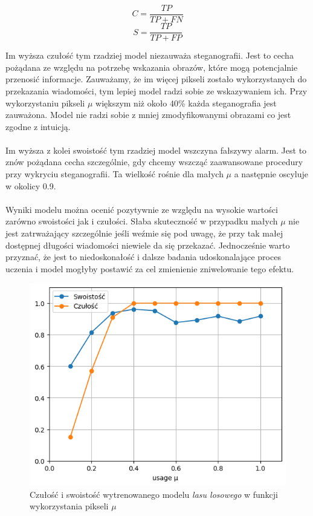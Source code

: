     \begin{equation}
        C = \frac{TP}{TP+FN}
        \label{eq:cul}
    \end{equation}
    \begin{equation}
    S = \frac{TP}{TP+FP}
        \label{eq:swo}
    \end{equation}

    Im wyższa czułość tym rzadziej model niezauważa steganografii. Jest to cecha pożądana ze względu na potrzebę wskazania obrazów, które mogą potencjalnie przenosić informacje. Zauważamy, że im więcej pikseli zostało wykorzystanych do przekazania wiadomości, tym lepiej model radzi sobie ze wskazywaniem ich. Przy wykorzystaniu pikseli $\mu$ większym niż około 40\% każda steganografia jest zauważona. Model nie radzi sobie z mniej zmodyfikowanymi obrazami co jest zgodne z intuicją. \\
    \\
    Im wyższa z kolei swoistość tym rzadziej model wszczyna fałszywy alarm. Jest to znów pożądana cecha szczególnie, gdy chcemy wszcząć zaawansowane procedury przy wykryciu steganografii. Ta wielkość rośnie dla małych $\mu$ a następnie oscyluje w okolicy 0.9. \\
    \\
    Wyniki modelu można ocenić pozytywnie ze względu na wysokie wartości zarówno swoistości jak i czułości. Słaba skuteczność w przypadku małych $\mu$ nie jest zatrważający szczególnie jeśli weźmie się pod uwagę, że przy tak małej dostępnej długości wiadomości niewiele da się przekazać. Jednocześnie warto przyznać, że jest to niedoskonałość i dalsze badania udoskonalające proces uczenia i model mogłyby postawić za cel zmienienie zniwelowanie tego efektu.
    
    \begin{figure}[H]
        \centering
        \includegraphics[width=0.5\linewidth]{img/metrics.png}
        \caption{Czułość i swoistość wytrenowanego modelu \textit{lasu losowego} w funkcji wykorzystania pikseli $\mu$}
        \label{fig:metrics}
    \end{figure}
